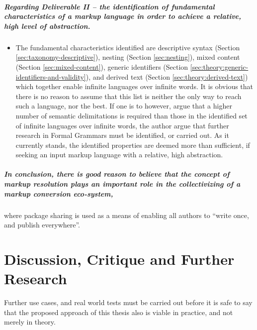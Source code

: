 \documentclass{scrreprt}
\begin{document}
\paragraph{Regarding Deliverable II -- the identification of fundamental characteristics of a markup language in order to achieve a relative, high level of abstraction. }
\begin{itemize}
\item The fundamental characteristics identified are descriptive syntax (Section \ref{sec:taxonomy-descriptive}), nesting (Section \ref{sec:nesting}), mixed content (Section \ref{sec:mixed-content}), generic identifiers (Section \ref{sec:theory:generic-identifiers-and-validity}), and derived text (Section \ref{sec:theory:derived-text}) which together enable infinite languages over infinite words. It is obvious that there is no reason to assume that this list is neither the only way to reach such a language, nor the best. If one is to however, argue that a higher number of semantic delimitations is required than those in the identified set of infinite languages over infinite words, the author argue that further research in Formal Grammars must be identified, or carried out. As it currently stands, the identified properties are deemed more than sufficient, if seeking an input markup language with a relative, high abstraction.
\end{itemize}



\paragraph{In conclusion, there is good reason to believe that the concept of markup resolution plays an important role in the collectivizing of a markup conversion eco-system,} where package sharing is used as a means of enabling all authors to ``write once, and publish everywhere''.











%
%
%
%
%
%


\chapter{Discussion, Critique and Further Research}
Further use cases, and real world tests must be carried out before it is safe to say that the proposed approach of this thesis also is viable in practice, and not merely in theory.
\end{document}

